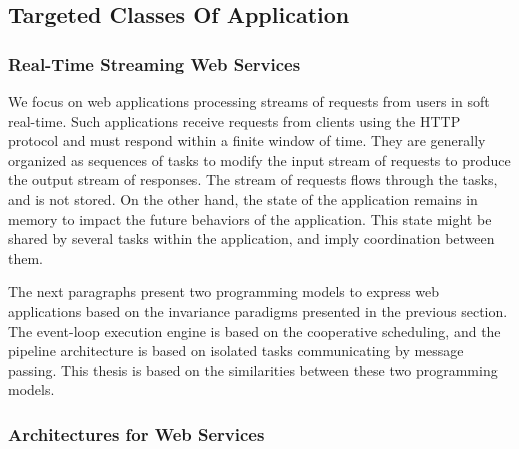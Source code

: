 \subsection{Targeted Classes Of Application}

\subsubsection{Real-Time Streaming Web Services}


We focus on web applications processing streams of requests from users in soft real-time.
Such applications receive requests from clients using the HTTP protocol and must respond within a finite window of time.
They are generally organized as sequences of tasks to modify the input stream of requests to produce the output stream of responses.
The stream of requests flows through the tasks, and is not stored.
On the other hand, the state of the application remains in memory to impact the future behaviors of the application.
This state might be shared by several tasks within the application, and imply coordination between them.

The next paragraphs present two programming models to express web applications based on the invariance paradigms presented in the previous section.
The event-loop execution engine is based on the cooperative scheduling, and the pipeline architecture is based on isolated tasks communicating by message passing.
This thesis is based on the similarities between these two programming models.

\subsubsection{Architectures for Web Services}


